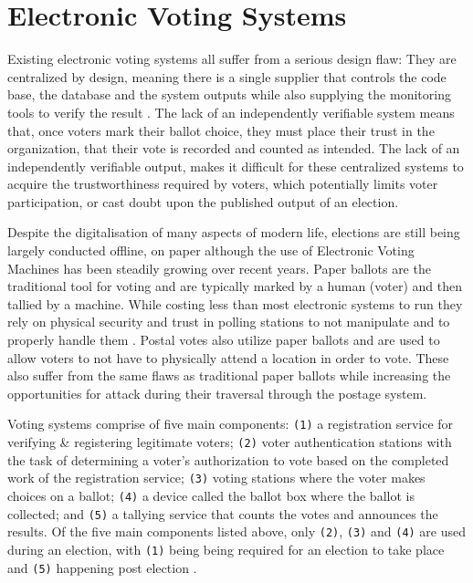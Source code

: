 \documentclass{article}
\begin{document}
    \section{Electronic Voting Systems}
    
    Existing electronic voting systems all suffer from a serious design flaw: They are centralized by design, meaning there is a single supplier that controls the code base, the database and the system outputs while also supplying the monitoring tools to verify the result \citep{3_noizat_2016}. The lack of an independently verifiable system means that, once voters mark their ballot choice, they must place their trust in the organization, that their vote is recorded and counted as intended. The lack of an independently verifiable output, makes it difficult for these centralized systems to acquire the trustworthiness required by voters, which potentially limits voter participation, or cast doubt upon the published output of an election.

Despite the digitalisation of many aspects of modern life, elections are still being largely conducted offline, on paper \citep{43_ernest_2014} although the use of Electronic Voting Machines has been steadily growing over recent years. Paper ballots are the traditional tool for voting and are typically marked by a human (voter) and then tallied by a machine. While costing less than most electronic systems to run they rely on physical security and trust in polling stations to not manipulate and to properly handle them \citep{44_wyndham_chen_das_2016}. Postal votes also utilize paper ballots and are used to allow voters to not have to physically attend a location in order to vote. These also suffer from the same flaws as traditional paper ballots while increasing the opportunities for attack during their traversal through the postage system.

Voting systems comprise of five main components: \verb|(1)| a registration service for verifying \& registering legitimate voters; \verb|(2)| voter authentication stations with the task of determining a voter’s authorization to vote based on the completed work of the registration service; \verb|(3)| voting stations where the voter makes choices on a ballot; \verb|(4)| a device called the ballot box where the ballot is collected; and \verb|(5)| a tallying service that counts the votes and announces the results. Of the five main components listed above, only \verb|(2)|, \verb|(3)| and \verb|(4)| are used during an election, with \verb|(1)| being being required for an election to take place and \verb|(5)| happening post election \citep{48_safevote_2001}.
\end{document}
